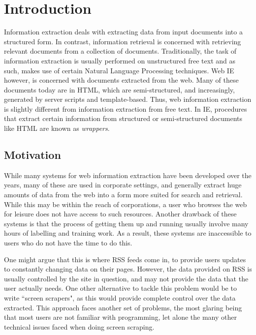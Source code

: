 \chapter{Introduction}
Information extraction deals with extracting data from input documents into a structured form. In contrast, information retrieval is concerned with retrieving relevant documents from a collection of documents. Traditionally, the task of information extraction is usually performed on unstructured free text and as such, makes use of certain Natural Language Processing techniques. Web IE however, is concerned with documents extracted from the web. Many of these documents today are in HTML, which are semi-structured, and increasingly, generated by server scripts and template-based. Thus, web information extraction is slightly different from information extraction from free text. In IE, procedures that extract certain information from structured or semi-structured documents like HTML are known as \textit{wrappers}.


\section{Motivation}
While many systems for web information extraction have been developed over the years, many of these are used in corporate settings, and generally extract huge amounts of data from the web into a form more suited for search and retrieval. While this may be within the reach of corporations, a user who browses the web for leisure does not have access to such resources. Another drawback of these systems is that the process of getting them up and running usually involve many hours of labelling and training work. As a result, these systems are inaccessible to users who do not have the time to do this.

One might argue that this is where RSS feeds come in, to provide users updates to constantly changing data on their pages. However, the data provided on RSS is usually controlled by the site in question, and may not provide the data that the user actually needs. One other alternative to tackle this problem would be to write ``screen scrapers", as this would provide complete control over the data extracted. This approach faces another set of problems, the most glaring being that most users are not familiar with programming, let alone the many other technical issues faced when doing screen scraping.


